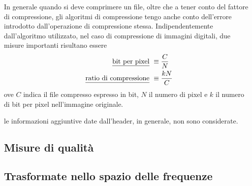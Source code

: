 \documentclass{subfiles}
\begin{document}
In generale quando si deve comprimere un file, oltre che a tener conto del fattore di compressione,
gli algoritmi di compressione tengo anche conto dell'errore introdotto dall'operazione di compressione stessa.
Indipendentemente dall'algoritmo utilizzato, nel caso di compressione di immagini digitali, due misure importanti risultano essere
\[\begin{aligned}
        \text{\underline{bit per pixel}}         & \equiv \frac{C}{N}  \\
        \text{\underline{ratio di compressione}} & \equiv \frac{kN}{C}
    \end{aligned}\]
ove \(C\) indica il file compresso espresso in bit, \(N\) il numero di pixel e \(k\) il numero di bit per pixel nell'immagine originale.

\begin{Note*}
    le informazioni aggiuntive date dall'header, in generale, non sono considerate.
\end{Note*}

\subsection{Misure di qualità}


\subsection{Trasformate nello spazio delle frequenze}

\end{document}
